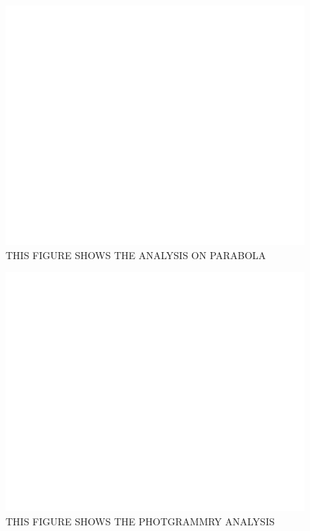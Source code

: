 \documentclass[preprint]{aastex}  %
\begin{document}
\begin{figure}[H]
	\begin{center}
	\includegraphics[width =\textwidth]{empty}
	\caption{THIS FIGURE SHOWS THE ANALYSIS ON PARABOLA
\label{Fig:} }
	\end{center}
\end{figure}
\clearpage

\begin{figure}[H]
	\begin{center}
	\includegraphics[width =\textwidth]{empty}
	\caption{THIS FIGURE SHOWS THE PHOTGRAMMRY ANALYSIS 
\label{Fig:} }
	\end{center}
\end{figure}
\clearpage
\end{document}
